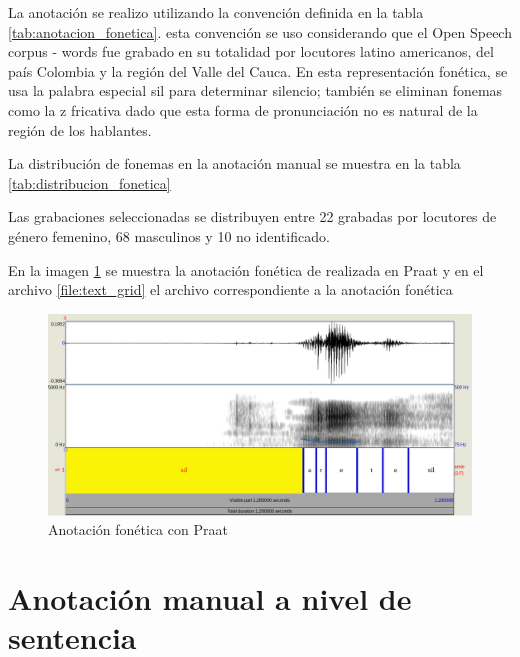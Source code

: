 La anotación se realizo utilizando la convención definida en la tabla \ref{tab:anotacion_fonetica}. esta convención se uso considerando que el Open Speech corpus - words fue grabado en su totalidad por locutores latino americanos, del país Colombia y la región del Valle del Cauca. En esta representación fonética, se usa la palabra especial sil para determinar silencio; también se eliminan fonemas como la z fricativa dado que esta forma de pronunciación no es natural de la región de los hablantes.




La distribución de fonemas en la anotación manual se muestra en la tabla \ref{tab:distribucion_fonetica}



Las grabaciones seleccionadas se distribuyen entre 22 grabadas por locutores de género femenino, 68 masculinos y 10 no identificado.

En la imagen \ref{img:anotacion_fonetica_praat} se muestra la anotación fonética de realizada en Praat y en el archivo \ref{file:text_grid} el archivo correspondiente a la anotación fonética



\begin{figure}[H]
\caption{Anotación fonética con Praat}
\label{img:anotacion_fonetica_praat}
\includegraphics[width=\textwidth]{imagenes/03_01_anotacion_fonetica.png}
\end{figure}





\section{Anotación manual a nivel de sentencia}

